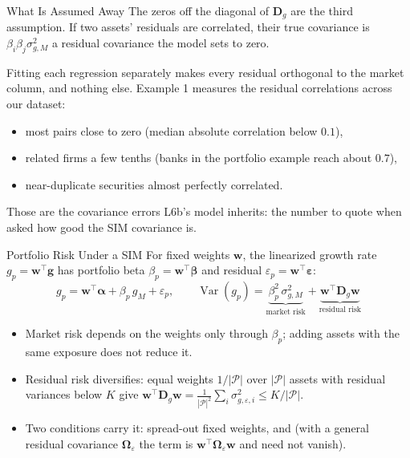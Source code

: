 \documentclass[aspectratio=169,11pt]{beamer}
\newcommand{\Var}{\operatorname{Var}}
\newcommand{\bg}{\mathbf{g}}
\newcommand{\bw}{\mathbf{w}}
\newcommand{\bal}{\boldsymbol{\alpha}}
\newcommand{\bbe}{\boldsymbol{\beta}}
\newcommand{\beps}{\boldsymbol{\varepsilon}}
\newcommand{\Dg}{\mathbf{D}_{g}}
\newcommand{\np}{|\mathcal P|}
\begin{document}
\begin{frame}{What Is Assumed Away}
  The zeros off the diagonal of $\Dg$ are the third assumption. If two assets'
  residuals are correlated, their true covariance is
  $\beta_i\beta_j\sigma^2_{g,M}$  a residual covariance the model
  sets to zero.

  \vspace{0.4em}
  Fitting each regression separately makes every residual orthogonal to the
  market column, and nothing else. Example 1 measures the residual correlations
  across our dataset:
  \begin{itemize}\setlength{\itemsep}{0.35em}
    \item most pairs close to zero (median absolute correlation below $0.1$),
    \item related firms a few tenths (banks in the portfolio example reach about $0.7$),
    \item near-duplicate securities almost perfectly correlated.
  \end{itemize}

  \vspace{0.3em}
  Those are the covariance errors L6b's model inherits: the number to quote when
  asked how good the SIM covariance is.
\end{frame}

\begin{frame}{Portfolio Risk Under a SIM}
  For fixed weights $\bw$, the linearized growth rate $g_p=\bw^{\top}\bg$ has
  portfolio beta $\beta_p=\bw^{\top}\bbe$ and residual
  $\varepsilon_p=\bw^{\top}\beps$:
  \[
    \boxed{g_p=\bw^{\top}\bal+\beta_p\,g_M+\varepsilon_p,\qquad
      \Var(g_p)=\underbrace{\beta_p^2\,\sigma^2_{g,M}}_{\text{market risk}}
      +\underbrace{\bw^{\top}\Dg\bw}_{\text{residual risk}}}
  \]

  \vspace{0.2em}
  \begin{itemize}\setlength{\itemsep}{0.45em}
    \item Market risk depends on the weights only through $\beta_p$; adding
      assets with the same exposure does not reduce it.
    \item Residual risk diversifies: equal weights $1/\np$ over $\np$ assets with
      residual variances below $K$ give
      $\bw^{\top}\Dg\bw=\frac{1}{\np^2}\sum_i\sigma^2_{g,\varepsilon,i}\le K/\np$.
    \item Two conditions carry it: spread-out fixed weights, and
       (with a general residual covariance
      $\boldsymbol\Omega_\varepsilon$ the term is
      $\bw^{\top}\boldsymbol\Omega_\varepsilon\bw$ and need not vanish).
  \end{itemize}
\end{frame}
\end{document}
